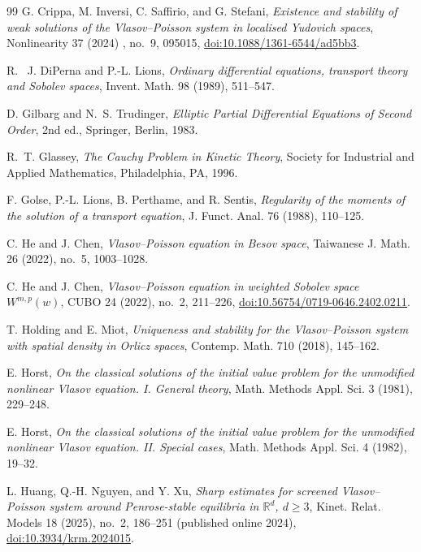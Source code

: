 \documentclass[11pt]{article}
\newcommand{\R}{\mathbb R}
\begin{document}
\begin{thebibliography}{99}
G. Crippa, M. Inversi, C. Saffirio, and G. Stefani,
\emph{Existence and stability of weak solutions of the Vlasov--Poisson
system in  localised  Yudovich spaces},
Nonlinearity 37 (2024) , no.~9, 095015,
\href{https://doi.org/10.1088/1361-6544/ad5bb3}
{doi:10.1088/1361-6544/ad5bb3}.

 R.~ J. DiPerna and P.-L. Lions,
\emph{Ordinary differential equations, transport theory and Sobolev spaces},
Invent. Math. 98 (1989), 511--547.
 

D. Gilbarg and N.~S. Trudinger,
\emph{Elliptic Partial Differential Equations of Second Order},
2nd ed., Springer, Berlin, 1983.

R.~T. Glassey,
\emph{The Cauchy Problem in Kinetic Theory},
Society for Industrial and Applied Mathematics, Philadelphia, PA, 1996.

F. Golse, P.-L. Lions, B. Perthame, and R. Sentis,
\emph{Regularity of the moments of the solution of a transport equation},
J. Funct. Anal. 76 (1988), 110--125.

C. He and J. Chen,
\emph{Vlasov--Poisson equation in Besov space},
Taiwanese J. Math. 26 (2022), no.~5, 1003--1028.

C. He and J. Chen,
\emph{Vlasov--Poisson equation in weighted Sobolev space $W^{m,p}(w)$},
CUBO 24 (2022), no.~2, 211--226,
\href{https://doi.org/10.56754/0719-0646.2402.0211}
{doi:10.56754/0719-0646.2402.0211}.

T. Holding and E. Miot,
\emph{Uniqueness and stability for the Vlasov--Poisson system with spatial
density in Orlicz spaces},
Contemp. Math. 710 (2018), 145--162.

E. Horst,
\emph{On the classical solutions of the initial value problem for the
unmodified nonlinear Vlasov equation. I. General theory},
Math. Methods Appl. Sci. 3 (1981), 229--248.

E. Horst,
\emph{On the classical solutions of the initial value problem for the
unmodified nonlinear Vlasov equation. II. Special cases},
Math. Methods Appl. Sci. 4 (1982), 19--32.

L. Huang, Q.-H. Nguyen, and Y. Xu,
\emph{Sharp estimates for screened Vlasov--Poisson system around
Penrose-stable equilibria in $\R^d$, $d\geq3$},
Kinet. Relat. Models 18 (2025), no.~2, 186--251
(published online 2024),
\href{https://doi.org/10.3934/krm.2024015}{doi:10.3934/krm.2024015}.


\end{thebibliography}
\end{document}
